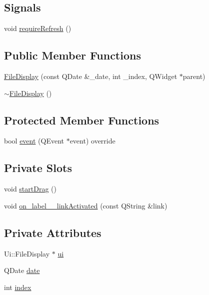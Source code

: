 \subsection*{Signals}
\begin{DoxyCompactItemize}
\item 
void \hyperlink{classFileDisplay_a82b770665aa3e87b8945871e65124c16}{require\+Refresh} ()
\end{DoxyCompactItemize}
\subsection*{Public Member Functions}
\begin{DoxyCompactItemize}
\item 
\hyperlink{classFileDisplay_a78758d0d7cf80cbe6f6a400cc9bb2bcd}{File\+Display} (const Q\+Date \&\+\_\+date, int \+\_\+index, Q\+Widget $\ast$parent)
\item 
\hyperlink{classFileDisplay_a57b1b3b135ad210a87ff04c7652dd846}{$\sim$\+File\+Display} ()
\end{DoxyCompactItemize}
\subsection*{Protected Member Functions}
\begin{DoxyCompactItemize}
\item 
bool \hyperlink{classFileDisplay_a679e676c4496c0b441753c5e6670be81}{event} (Q\+Event $\ast$event) override
\end{DoxyCompactItemize}
\subsection*{Private Slots}
\begin{DoxyCompactItemize}
\item 
void \hyperlink{classFileDisplay_aaffa2b93339b7a84b8af28847fa1f099}{start\+Drag} ()
\item 
void \hyperlink{classFileDisplay_a62f53655eacd44d1026f7fe7808e7a1f}{on\+\_\+label\+\_\+\_\+link\+Activated} (const Q\+String \&link)
\end{DoxyCompactItemize}
\subsection*{Private Attributes}
\begin{DoxyCompactItemize}
\item 
Ui\+::\+File\+Display $\ast$ \hyperlink{classFileDisplay_a0f69fef4d0c94b979e55dd8d97f196c7}{ui}
\item 
Q\+Date \hyperlink{classFileDisplay_a0a82f6e8e67ad36ef80575ec6be86372}{date}
\item 
int \hyperlink{classFileDisplay_aceb0af801357d0fff3b09bd1285136f7}{index}
\end{DoxyCompactItemize}


